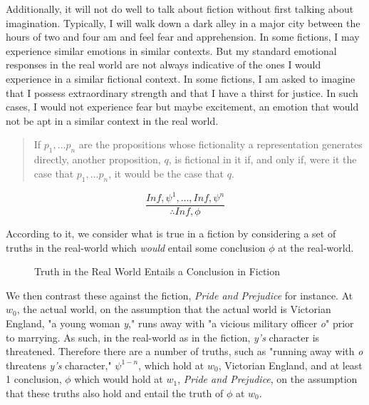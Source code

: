 \documentclass[phdthesis,12pt,final]{wuthesis}
\theoremstyle{definition}
\theoremstyle{definition}
\theoremstyle{definition}
\theoremstyle{definition}
\theoremstyle{remark}
\begin{document}
Additionally, it will not do well to talk about fiction without first talking about imagination. Typically, I will walk down a dark alley in a major city between the hours of two and four am and feel fear and apprehension. In some fictions, I may experience similar emotions in similar contexts. But my standard emotional responses in the real world are not always indicative of the ones I would experience in a similar fictional context. In some fictions, I am asked to imagine that I possess extraordinary strength and that I have a thirst for justice. In such cases, I would not experience fear but maybe excitement, an emotion that would not be apt in a similar context in the real world.

\begin{quote}
If \(p_{1}, . . . p_{n}\) are the propositions whose fictionality a representation generates directly, another proposition, \(q\), is fictional in it if, and only if, were it the case that \(p_{1}, . . . p_{n}\), it would be the case that \(q\).
\end{quote}

\[\frac{In f, \psi^{1}, . . ., In f, \psi^{n}}{\therefore In f, \phi}\]

According to it, we consider what is true in a fiction by considering a set of truths in the real-world which \emph{would} entail some conclusion \(\phi\) at the real-world.

\begin{figure}
\centering
\caption{Truth in the Real World Entails a Conclusion in Fiction}
\label{fig:truth-fiction}
\end{figure}

We then contrast these against the fiction, \emph{Pride and Prejudice} for instance. At \(w_{0}\), the actual world, on the assumption that the actual world is Victorian England, "a young woman \emph{y}," runs away with "a vicious military officer \emph{o}" prior to marrying. As such, in the real-world as in the fiction, \emph{y's} character is threatened. Therefore there are a number of truths, such as "running away with \emph{o} threatens \emph{y's} character," \(\psi^{1-n}\), which hold at \(w_{0}\), Victorian England, and at least 1 conclusion, \(\phi\) which would hold at \(w_{1}\), \emph{Pride and Prejudice}, on the assumption that these truths also hold and entail the truth of \(\phi\) at \(w_{0}\).
\end{document}
